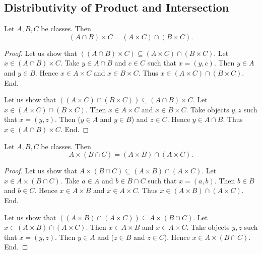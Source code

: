 \documentclass[10pt]{article}
\begin{document}
  \subsection{Distributivity of Product and Intersection}

  \begin{forthel}
    \begin{proposition}
      Let $A, B, C$ be classes.
      Then \[ (A \cap B) \times C = (A \times C) \cap (B \times C). \]
    \end{proposition}
    \begin{proof}
      Let us show that $((A \cap B) \times C) \subseteq
      (A \times C) \cap (B \times C)$. %
        Let $x \in (A \cap B) \times C$.
        Take $y \in A \cap B$ and $c \in C$ such that $x = (y, c)$.
        Then $y \in A$ and $y \in B$.
        Hence $x \in A \times C$ and $x \in B \times C$.
        Thus $x \in (A \times C) \cap (B \times C)$.
      End.

      Let us show that $((A \times C) \cap (B \times C)) \subseteq
      (A \cap B) \times C$. %
        Let $x \in (A \times C) \cap (B \times C)$.
        Then $x \in A \times C$ and $x \in B \times C$.
        Take objects $y, z$ such that $x = (y, z)$.
        Then ($y \in A$ and $y \in B$) and $z \in C$.
        Hence $y \in A \cap B$.
        Thus $x \in (A \cap B) \times C$.
      End.
    \end{proof}
  \end{forthel}

  \begin{forthel}
    \begin{proposition}
      Let $A, B, C$ be classes.
      Then \[ A \times (B \cap C) = (A \times B) \cap (A \times C). \]
    \end{proposition}
    \begin{proof}
      Let us show that $A \times (B \cap C) \subseteq
      (A \times B) \cap (A \times C)$.
        Let $x \in A \times (B \cap C)$.
        Take $a \in A$ and $b \in B \cap C$ such that $x = (a, b)$.
        Then $b \in B$ and $b \in C$.
        Hence $x \in A \times B$ and $x \in A \times C$.
        Thus $x \in (A \times B) \cap (A \times C)$.
      End.

      Let us show that $((A \times B) \cap (A \times C)) \subseteq
      A \times (B \cap C)$. %
        Let $x \in (A \times B) \cap (A \times C)$.
        Then $x \in A \times B$ and $x \in A \times C$.
        Take objects $y, z$ such that $x = (y, z)$.
        Then $y \in A$ and ($z \in B$ and $z \in C$).
        Hence $x \in A \times (B \cap C)$.
      End.
    \end{proof}
  \end{forthel}
\end{document}
